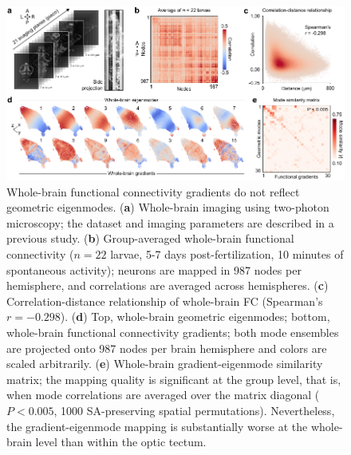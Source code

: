 \documentclass{article}
\begin{document}
\begin{figure}[t]
    \centering
    \includegraphics[width=1.0\linewidth]{figures/supp_wholebrain.pdf}
    \caption{Whole-brain functional connectivity gradients do not reflect geometric eigenmodes. (\textbf{a}) Whole-brain imaging using two-photon microscopy; the dataset and imaging parameters are described in a previous study. (\textbf{b}) Group-averaged whole-brain functional connectivity ($n=22$ larvae, 5-7 days post-fertilization, 10 minutes of spontaneous activity); neurons are mapped in 987 nodes per hemisphere, and correlations are averaged across hemispheres. (\textbf{c}) Correlation-distance relationship of whole-brain FC (Spearman's $r=-0.298$). (\textbf{d}) Top, whole-brain geometric eigenmodes; bottom, whole-brain functional connectivity gradients; both mode ensembles are projected onto 987 nodes per brain hemisphere and colors are scaled arbitrarily. (\textbf{e}) Whole-brain gradient-eigenmode similarity matrix; the mapping quality is significant at the group level, that is, when mode correlations are averaged over the matrix diagonal ($P<0.005$, 1000 SA-preserving spatial permutations). Nevertheless, the gradient-eigenmode mapping is substantially worse at the whole-brain level than within the optic tectum.}
    \label{supp_wholebrain}
\end{figure}

\newpage
\end{document}
